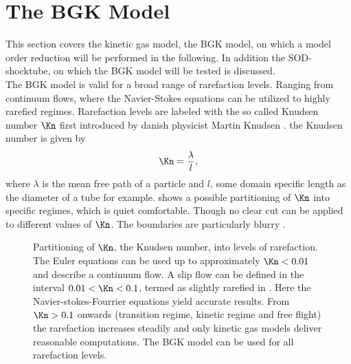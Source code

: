 

\chapter{The BGK Model}
\label{Ch:BGK}




This section covers the kinetic gas model, the BGK model, on which a model order reduction will be performed in the following. In addition the SOD-shocktube, on which the BGK model will be tested is discussed.\\
The BGK model is valid for a broad range of rarefaction levels. Ranging from continuum flows, where the Navier-Stokes equations can be utilized to highly rarefied regimes. Rarefaction levels are labeled with the so called Knudsen number \(\Kn\) first introduced by danish physicist Martin Knudsen \cite{Bernard}. the Knudsen number is given by
\begin{equation}
	\Kn = \frac{\lambda}{l}, 
\end{equation}
where \(\lambda\) is the mean free path of a particle and \(l\), some domain specific length as the diameter of a tube for example.  shows a possible partitioning of \(\Kn\) into specific regimes, which is quiet comfortable. Though no clear cut can be applied to different values of \(\Kn\). The boundaries are particularly blurry \cite{schaaf}.
\begin{figure}[H]
	
	\caption{Partitioning of \(\Kn\), the Knudsen number, into levels of rarefaction. The Euler equations can be used up to approximately \(\Kn < 0.01\) and describe a \glqq continuum flow\grqq{}. A \grqq slip flow\grqq{} can be defined in the interval \(0.01 < \Kn < 0.1\), termed as slightly rarefied in \cite{schaaf}. Here the Navier-stokes-Fourrier equations yield accurate results. From \(\Kn > 0.1\) onwards (transition regime, kinetic regime and free flight) the rarefaction increases steadily and only kinetic gas models deliver reasonable computations. The BGK model can be used for all rarefaction levels.}
	\label{Fig:ExpKN}
\end{figure}
